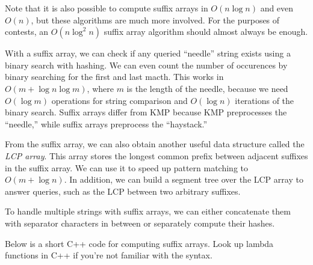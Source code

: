 Note that it is also possible to compute suffix arrays in $O(n \log n)$ and even $O(n)$, but these algorithms are much more involved. For the purposes of contests, an $O(n \log^2 n)$ suffix array algorithm should almost always be enough.

With a suffix array, we can check if any queried ``needle'' string exists using a binary search with hashing. We can even count the number of occurences by binary searching for the first and last macth. This works in $O(m + \log n \log m)$, where $m$ is the length of the needle, because we need $O(\log m)$ operations for string comparison and $O(\log n)$ iterations of the binary search. Suffix arrays differ from KMP because KMP preprocesses the ``needle,'' while suffix arrays preprocess the ``haystack.'' 

From the suffix array, we can also obtain another useful data structure called the \emph{LCP array}. This array stores the longest common prefix between adjacent suffixes in the suffix array. We can use it to speed up pattern matching to $O(m + \log n)$. In addition, we can build a segment tree over the LCP array to answer queries, such as the LCP between two arbitrary suffixes.

To handle multiple strings with suffix arrays, we can either concatenate them with separator characters in between or separately compute their hashes.

Below is a short C++ code for computing suffix arrays. Look up lambda functions in C++ if you're not familiar with the syntax.


